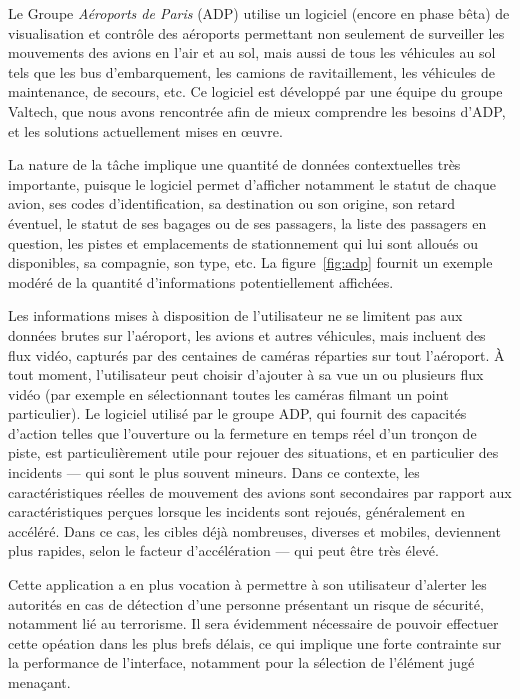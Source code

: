 	Le Groupe \emph{Aéroports de Paris} (ADP) utilise un logiciel (encore en phase bêta) de visualisation et contrôle des aéroports permettant non seulement de surveiller les mouvements des avions en l'air et au sol, mais aussi de tous les véhicules au sol tels que les bus d'embarquement, les camions de ravitaillement, les véhicules de maintenance, de secours, etc. Ce logiciel est développé par une équipe du groupe Valtech\footnotemark{}, que nous avons rencontrée afin de mieux comprendre les besoins d'ADP, et les solutions actuellement mises en \oe{}uvre.
	
	
	La nature de la tâche implique une quantité de données contextuelles très importante, puisque le logiciel permet d'afficher notamment le statut de chaque avion, ses codes d'identification, sa destination ou son origine, son retard éventuel, le statut de ses bagages ou de ses passagers, la liste des passagers en question, les pistes et emplacements de stationnement qui lui sont alloués ou disponibles, sa compagnie, son type, etc. La figure~\ref{fig:adp} fournit un exemple modéré de la quantité d'informations potentiellement affichées.
	
	Les informations mises à disposition de l'utilisateur ne se limitent pas aux données brutes sur l'aéroport, les avions et autres véhicules, mais incluent des flux vidéo, capturés par des centaines de caméras réparties sur tout l'aéroport. À tout moment, l'utilisateur peut choisir d'ajouter à sa vue un ou plusieurs flux vidéo (par exemple en sélectionnant toutes les caméras filmant un point particulier). Le logiciel utilisé par le groupe ADP, qui fournit des capacités d'action telles que l'ouverture ou la fermeture en temps réel d'un tronçon de piste, est particulièrement utile pour rejouer des situations, et en particulier des incidents --- qui sont le plus souvent mineurs. Dans ce contexte, les caractéristiques réelles de mouvement des avions sont secondaires par rapport aux caractéristiques perçues lorsque les incidents sont rejoués, généralement en accéléré. Dans ce cas, les cibles déjà nombreuses, diverses et mobiles, deviennent plus rapides, selon le facteur d'accélération --- qui peut être très élevé.
	
	Cette application a en plus vocation à permettre à son utilisateur d'alerter les autorités en cas de détection d'une personne présentant un risque de sécurité, notamment lié au terrorisme. Il sera évidemment nécessaire de pouvoir effectuer cette opéation dans les plus brefs délais, ce qui implique une forte contrainte sur la performance de l'interface, notamment pour la sélection de l'élément jugé menaçant.
	
